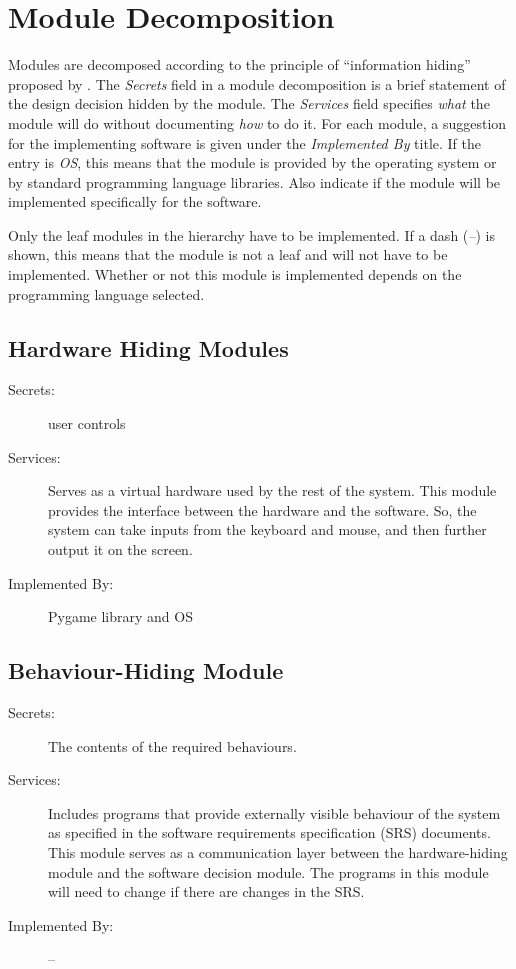 \documentclass[12pt, titlepage]{article}
\begin{document}
\section{Module Decomposition} \label{SecMD}

Modules are decomposed according to the principle of ``information hiding''
proposed by \citet{ParnasEtAl1984}. The \emph{Secrets} field in a module
decomposition is a brief statement of the design decision hidden by the
module. The \emph{Services} field specifies \emph{what} the module will do
without documenting \emph{how} to do it. For each module, a suggestion for the
implementing software is given under the \emph{Implemented By} title. If the
entry is \emph{OS}, this means that the module is provided by the operating
system or by standard programming language libraries.  Also indicate if the
module will be implemented specifically for the software.

Only the leaf modules in the
hierarchy have to be implemented. If a dash (\emph{--}) is shown, this means
that the module is not a leaf and will not have to be implemented. Whether or
not this module is implemented depends on the programming language
selected.

\subsection{Hardware Hiding Modules }

\begin{description}
\item[Secrets:] user controls
\item[Services:] Serves as a virtual hardware used by the rest of the
  system. This module provides the interface between the hardware and the
  software. So, the system can take inputs from the keyboard and mouse, and then further output it on the screen.
\item[Implemented By:] Pygame library and OS
\end{description}

\subsection{Behaviour-Hiding Module}

\begin{description}
\item[Secrets:]The contents of the required behaviours.
\item[Services:] Includes programs that provide externally visible behaviour of
  the system as specified in the software requirements specification (SRS)
  documents. This module serves as a communication layer between the
  hardware-hiding module and the software decision module. The programs in this
  module will need to change if there are changes in the SRS.
\item[Implemented By:] --

\end{description}
\end{document}
